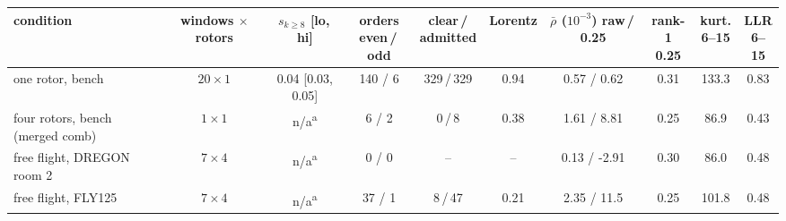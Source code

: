 \begin{tabular}{@{}lccccccccc@{}}
\toprule
condition & \shortstack{windows\\$\times$rotors} & \shortstack{$s_{k\geq 8}$\\ {[}lo,\,hi{]}} & \shortstack{orders\\even\,/\,odd} & \shortstack{clear\,/\\admitted} & Lorentz & \shortstack{$\bar\rho$ ($10^{-3}$)\\raw\,/\,0.25} & \shortstack{rank-1\\0.25} & \shortstack{kurt.\\6--15} & \shortstack{LLR\\6--15} \\
\midrule
one rotor, bench & $20\!\times\!1$ & 0.04 [0.03, 0.05] & 140 / 6 & 329\,/\,329 & 0.94 & 0.57 / 0.62 & 0.31 & 133.3 & 0.83 \\
four rotors, bench (merged comb) & $1\!\times\!1$ & n/a\textsuperscript{a} & 6 / 2 & 0\,/\,8 & 0.38 & 1.61 / 8.81 & 0.25 & 86.9 & 0.43 \\
free flight, DREGON room 2 & $7\!\times\!4$ & n/a\textsuperscript{a} & 0 / 0 & -- & -- & 0.13 / -2.91 & 0.30 & 86.0 & 0.48 \\
free flight, FLY125 & $7\!\times\!4$ & n/a\textsuperscript{a} & 37 / 1 & 8\,/\,47 & 0.21 & 2.35 / 11.5 & 0.25 & 101.8 & 0.48 \\
\bottomrule
\end{tabular}
